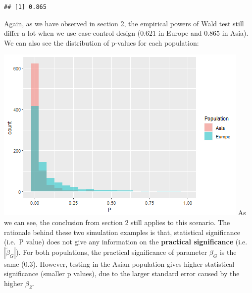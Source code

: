 \documentclass[
]{article}
\newenvironment{Shaded}{\begin{snugshade}}{\end{snugshade}}
\newcommand{\DataTypeTok}[1]{\textcolor[rgb]{0.13,0.29,0.53}{#1}}
\newcommand{\DecValTok}[1]{\textcolor[rgb]{0.00,0.00,0.81}{#1}}
\newcommand{\FloatTok}[1]{\textcolor[rgb]{0.00,0.00,0.81}{#1}}
\newcommand{\KeywordTok}[1]{\textcolor[rgb]{0.13,0.29,0.53}{\textbf{#1}}}
\newcommand{\NormalTok}[1]{#1}
\newcommand{\OperatorTok}[1]{\textcolor[rgb]{0.81,0.36,0.00}{\textbf{#1}}}
\newcommand{\StringTok}[1]{\textcolor[rgb]{0.31,0.60,0.02}{#1}}
\begin{document}
\begin{verbatim}
## [1] 0.865
\end{verbatim}

Again, as we have observed in section 2, the empirical powers of Wald
test still differ a lot when we use case-control design (\(0.621\) in
Europe and \(0.865\) in Asia). We can also see the distribution of
p-values for each population:

\begin{Shaded}
\end{Shaded}

\includegraphics{GWAS-Pvalues_files/figure-latex/visualCaseControl-1.png}
As we can see, the conclusion from section 2 still applies to this
scenario. The rationale behind these two simulation examples is that,
statistical significance (i.e.~P value) does not give any information on
the \textbf{practical significance} (i.e.~\(|\tilde{\beta}_G|\)). For
both populations, the practical significance of parameter \(\beta_G\) is
the same (0.3). However, testing in the Asian population gives higher
statistical significance (smaller p values), due to the larger standard
error caused by the higher \(\beta_Z\).
\end{document}
